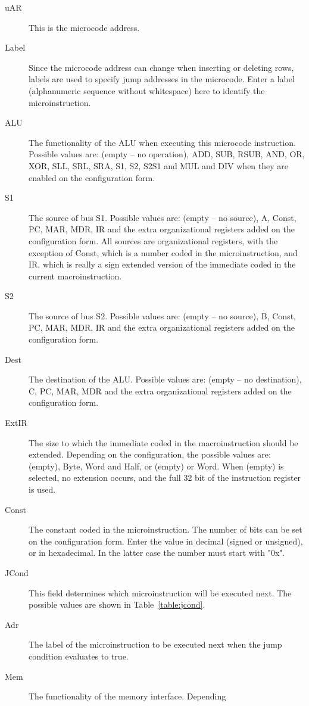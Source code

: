 \documentclass{article}
\begin{document}
\begin{description}
\item[uAR ]This is the microcode address. 
\item[Label] Since the microcode address can change when inserting or deleting rows, labels are used to specify jump addresses
in the microcode. Enter a label (alphanumeric sequence without whitespace) here to identify the microinstruction.
\item[ALU] The functionality of the ALU when executing this microcode instruction. Possible values are: (empty --
 no operation), ADD, SUB, RSUB, AND, OR, XOR, SLL, SRL, SRA, S1, S2, 
S2S1 and MUL and DIV when they are enabled on the configuration form.
\item[S1] The source of bus S1. Possible values are: (empty --
 no source), A, Const, PC, MAR, MDR, IR and the extra organizational 
registers added on the configuration form. All sources are 
organizational registers, with the exception of Const, which is a number
 coded in the microinstruction, and IR, which is really a sign extended 
version of the immediate coded in the current macroinstruction. 
\item[S2] The source of bus S2. Possible values are: (empty -- no source), B, Const, PC, MAR, MDR, IR and the extra organizational registers added on the configuration form.
\item[Dest] The destination of the ALU. Possible values are: (empty -- no destination), C, PC, MAR, MDR and the extra organizational registers added on the configuration form.
\item[ExtIR] The size to which the immediate coded in the 
macroinstruction should be extended. Depending on the configuration, the
 possible values are: (empty), Byte, Word and Half, or (empty) or Word. 
When (empty) is selected, no
extension occurs, and the full 32 bit of the instruction register is 
used.
\item[Const] The constant coded in the microinstruction. The 
number of bits can be set on the configuration form. Enter the value in 
decimal (signed or unsigned), or in hexadecimal. In the latter case the 
number must start with "0x".
\item[JCond] This field determines which microinstruction will be executed next. The possible values are shown in Table~\ref{table:jcond}.
\item[Adr] The label of the microinstruction to be executed next when the jump condition evaluates to true.
\item[Mem] The functionality of the memory interface. Depending

\end{description}
\end{document}
